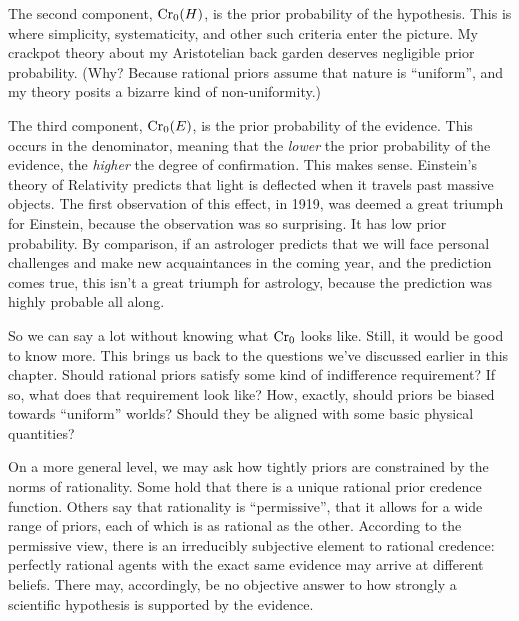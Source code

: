 The second component, $\text{Cr}_{0}(H)$, is the prior probability of the hypothesis.
This is where simplicity, systematicity, and other such criteria enter the
picture. My crackpot theory about my Aristotelian back garden deserves
negligible prior probability. (Why? Because rational priors assume that nature is
``uniform'', and my theory posits a bizarre kind of non-uniformity.)

The third component, $\text{Cr}_{0}(E)$, is the prior probability of the evidence.
This occurs in the denominator, meaning that the \emph{lower} the prior
probability of the evidence, the \emph{higher} the degree of confirmation. This
makes sense. Einstein's theory of Relativity predicts that light is deflected
when it travels past massive objects. The first observation of this effect, in
1919, was deemed a great triumph for Einstein, because the observation was so
surprising. It has low prior probability. By comparison, if an astrologer predicts that we will face personal
challenges and make new acquaintances in the coming year, and the prediction
comes true, this isn't a great triumph for astrology, because the prediction was
highly probable all along.



So we can say a lot without knowing what $\text{Cr}_{0}$ looks like. Still, it would
be good to know more. This brings us back to the questions we've discussed
earlier in this chapter. Should rational priors satisfy some kind of
indifference requirement? If so, what does that requirement look like? How,
exactly, should priors be biased towards ``uniform'' worlds? Should they be
aligned with some basic physical quantities?

On a more general level, we may ask how tightly priors are constrained by the
norms of rationality. Some hold that there is a unique rational prior credence
function. Others say that rationality is ``permissive'', that it allows for a
wide range of priors, each of which is as rational as the other. According to
the permissive view, there is an irreducibly subjective element to rational
credence: perfectly rational agents with the exact same evidence may arrive at
different beliefs. There may, accordingly, be no objective answer to how
strongly a scientific hypothesis is supported by the evidence.

